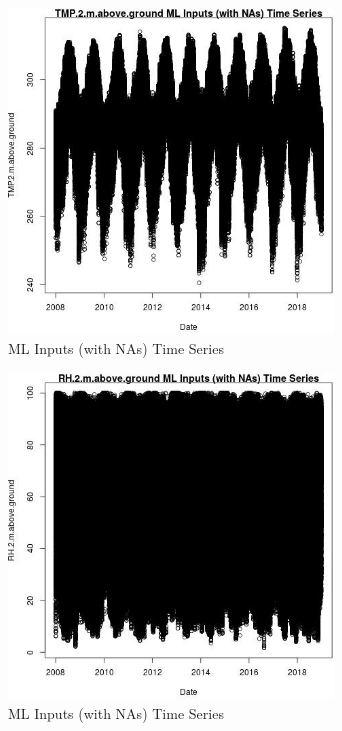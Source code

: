 \begin{figure} 
\centering  
\includegraphics[width=0.77\textwidth]{Code_Outputs/Report_ML_input_PM25_Step4_part_f_de_duplicated_aveswNAs_TMP2mabovegroundvDate.jpg} 
\caption{\label{fig:Report_ML_input_PM25_Step4_part_f_de_duplicated_aveswNAsTMP2mabovegroundvDate}ML Inputs (with NAs) Time Series} 
\end{figure} 
 

\begin{figure} 
\centering  
\includegraphics[width=0.77\textwidth]{Code_Outputs/Report_ML_input_PM25_Step4_part_f_de_duplicated_aveswNAs_RH2mabovegroundvDate.jpg} 
\caption{\label{fig:Report_ML_input_PM25_Step4_part_f_de_duplicated_aveswNAsRH2mabovegroundvDate}ML Inputs (with NAs) Time Series} 
\end{figure} 
 

